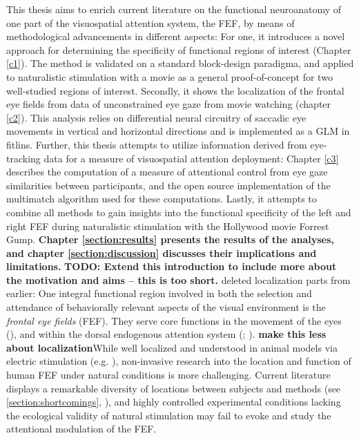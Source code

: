 \documentclass[a4paper, 12pt]{scrreprt}
\begin{document}
This thesis aims to enrich current literature on the functional neuroanatomy of one part of the visuospatial attention system, the FEF, by means of methodological advancements in different aspects: For one, it introduces a novel approach for determining the specificity of functional regions of interest (Chapter \ref{c1}). The method is validated on a standard block-design paradigma, and applied to naturalistic stimulation with a movie as a general proof-of-concept for two well-studied regions of interest.
Secondly, it shows  the localization of the frontal eye fields from data of unconstrained eye gaze from movie watching (chapter \ref{c2}). This analysis relies on differential neural circuitry of saccadic eye movements in vertical and horizontal directions and is implemented as a GLM in fitlins. Further, this thesis attempts to utilize information derived from eye-tracking data for a measure of visuospatial attention deployment: Chapter \ref{c3} describes the computation of a measure of attentional control from eye gaze similarities between participants, and the open source implementation of the multimatch algorithm used for these computations. Lastly, it attempts to combine all methods to gain insights into the functional specificity of the left and right FEF during naturalistic stimulation with the Hollywood movie Forrest Gump. \textbf{Chapter \ref{section:results} presents the results of the analyses, and chapter \ref{section:discussion} discusses their implications and limitations.} \newline
\textbf{TODO: Extend this introduction to include more about the motivation and aims -- this is too short.}
{\tiny
deleted localization parts from earlier: One integral functional region involved in both the selection and attendance of behaviorally relevant aspects of the visual environment is the \textit{frontal eye fields} (FEF). They serve core functions in the movement of the eyes (\cite{krauzlis2014eye}), and within the dorsal endogenous attention system (\cite{corbetta2002control}; \cite{corbetta2008reorienting}). \textbf{make this less about localization}While well localized and understood in animal models via electric stimulation (e.g. \cite{bruce1985primate}), non-invasive research into the location and function of human FEF under natural conditions is more challenging. Current literature displays a remarkable diversity of locations between subjects and methods (see \ref{section:shortcomings}, \cite{vernet2014corrigendum}), and highly controlled experimental conditions lacking the ecological validity of natural stimulation may fail to evoke and study the attentional modulation of the FEF.}
\end{document}
